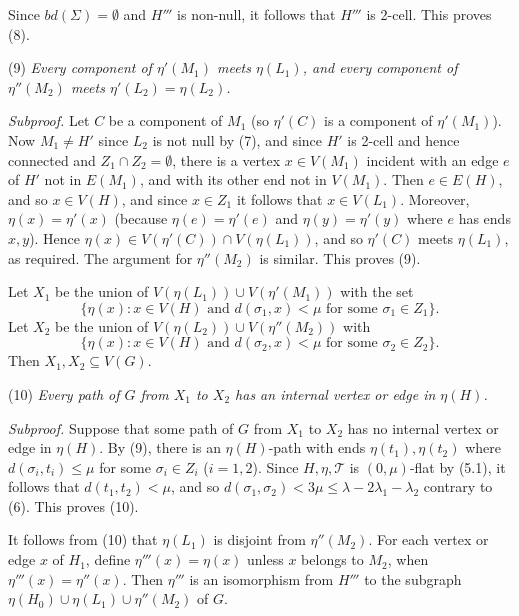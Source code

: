Since $bd(\Sigma) = \emptyset$ and $H'''$ is non-null, it follows that $H'''$ is 2-cell. This proves (8).

\hspace*{12pt}(9) \textit{Every component of $\eta'(M_1)$ meets $\eta(L_1)$, and every component of $\eta''(M_2)$ meets $\eta'(L_2) = \eta(L_2)$.}

\textit{Subproof.} Let $C$ be a component of $M_1$ (so $\eta'(C)$ is a component of $\eta'(M_1)$). Now $M_1 \ne H'$ since $L_2$ is not null by (7), and since $H'$ is 2-cell and hence connected and $Z_1 \cap Z_2 = \emptyset$, there is a vertex $x \in V(M_1)$ incident with an edge $e$ of $H'$ not in $E(M_1)$, and with its other end not in $V(M_1)$. Then $e \in E(H)$, and so $x \in V(H)$, and since $x \in Z_1$ it follows that $x \in V(L_1)$. Moreover, $\eta(x) = \eta'(x)$ (because $\eta(e) = \eta'(e)$ and $\eta(y) = \eta'(y)$ where $e$ has ends $x, y$). Hence $\eta(x) \in V(\eta'(C)) \cap V(\eta(L_1))$, and so $\eta'(C)$ meets $\eta(L_1)$, as required. The argument for $\eta''(M_2)$ is similar. This proves (9).

Let $X_1$ be the union of $V(\eta(L_1)) \cup V(\eta'(M_1))$ with the set
\begin{equation*}
\{\eta(x) : x \in V(H) \text{ and } d(\sigma_1, x) < \mu \text{ for some } \sigma_1 \in Z_1\}.
\end{equation*}
Let $X_2$ be the union of $V(\eta(L_2)) \cup V(\eta''(M_2))$ with
\begin{equation*}
\{\eta(x) : x \in V(H) \text{ and } d(\sigma_2, x) < \mu \text{ for some } \sigma_2 \in Z_2\}.
\end{equation*}
Then $X_1, X_2 \subseteq V(G)$.

\hspace*{12pt}(10) \textit{Every path of $G$ from $X_1$ to $X_2$ has an internal vertex or edge in $\eta(H)$.}

\textit{Subproof.} Suppose that some path of $G$ from $X_1$ to $X_2$ has no internal vertex or edge in $\eta(H)$. By (9), there is an $\eta(H)$-path with ends $\eta(t_1), \eta(t_2)$ where $d(\sigma_i, t_i) \le \mu$ for some $\sigma_i \in Z_i$ ($i = 1, 2$). Since $H, \eta, \mathcal{T}$ is $(0, \mu)$-flat by (5.1), it follows that $d(t_1, t_2) < \mu$, and so $d(\sigma_1, \sigma_2) < 3\mu \le \lambda - 2\lambda_1 - \lambda_2$ contrary to (6). This proves (10).

It follows from (10) that $\eta(L_1)$ is disjoint from $\eta''(M_2)$. For each vertex or edge $x$ of $H_1$, define $\eta'''(x) = \eta(x)$ unless $x$ belongs to $M_2$, when $\eta'''(x) = \eta''(x)$. Then $\eta'''$ is an isomorphism from $H'''$ to the subgraph $\eta(H_0) \cup \eta(L_1) \cup \eta''(M_2)$ of $G$.

